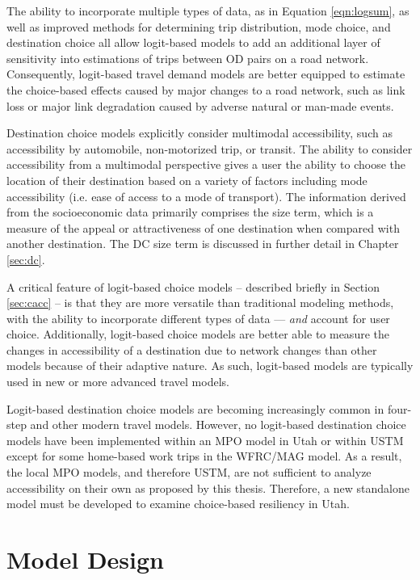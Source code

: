 The ability to incorporate multiple types of data, as in Equation \ref{eqn:logsum}, as well as improved methods
for determining trip distribution, mode choice, and destination choice all allow
logit-based models to add an additional layer of sensitivity into estimations of
trips between OD pairs on a road network. Consequently, logit-based travel
demand models are better equipped to estimate the choice-based effects caused
by major changes to a road network, such as link loss or major link degradation
caused by adverse natural or man-made events.

Destination choice models explicitly consider multimodal accessibility, such as accessibility by automobile,
non-motorized trip, or transit. The ability to consider accessibility from a
multimodal perspective gives a user the ability to choose the location of
their destination based on a variety of factors including mode accessibility
(i.e. ease of access to a mode of transport). The information
derived from the socioeconomic data primarily comprises the size term, which
is a measure of the appeal or attractiveness of one destination when compared with
another destination. The DC size term is discussed in further detail in
Chapter \ref{sec:dc}.

A critical feature of logit-based choice models – described briefly in Section
\ref{sec:cacc} – is that they are more versatile than traditional modeling
methods, with the ability to incorporate different types of data --- \textit{and}
account for user choice. Additionally, logit-based choice models are better
able to measure the changes in accessibility of a destination due to network
changes than other models because of their adaptive nature. As such, logit-based
models are typically used in new or more advanced travel models.

Logit-based destination choice models are becoming increasingly common in four-
step and other modern travel models. However, no logit-based destination
choice models have been implemented within an MPO model in Utah or within
USTM except for some home-based work trips in the WFRC/MAG model. As a result,
the local MPO models, and therefore USTM, are not sufficient to analyze
accessibility on their own as proposed by this thesis. Therefore, a new
standalone model must be developed to examine choice-based resiliency in Utah.

\section{Model Design} \label{Model Design}

